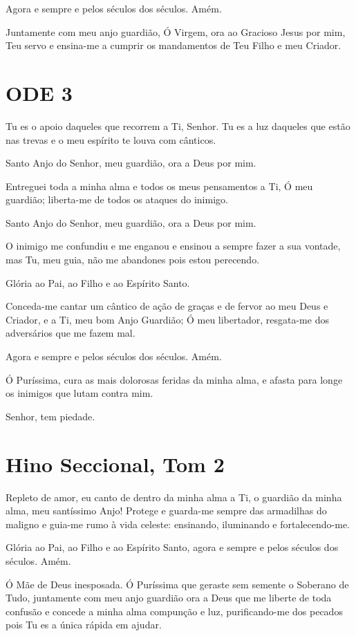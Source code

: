 \documentclass{subfiles}
\begin{document}
Agora e sempre e pelos séculos dos séculos. Amém.

Juntamente com meu anjo guardião, Ó Virgem, ora ao Gracioso Jesus
por mim, Teu servo e ensina-me a cumprir os mandamentos de Teu Filho e
meu Criador.

\section*{ODE 3}

\eirmos{}Tu es o apoio daqueles que recorrem a Ti, Senhor. Tu es a luz daqueles
que estão nas trevas e o meu espírito te louva com cânticos.

Santo Anjo do Senhor, meu guardião, ora a Deus por mim.

Entreguei toda a minha alma e todos os meus pensamentos a Ti, Ó
meu guardião; liberta-me de todos os ataques do inimigo.

Santo Anjo do Senhor, meu guardião, ora a Deus por mim.

O inimigo me confundiu e me enganou e ensinou a sempre fazer a sua
vontade, mas Tu, meu guia, não me abandones pois estou perecendo.

Glória ao Pai, ao Filho e ao Espírito Santo.

Conceda-me cantar um cântico de ação de graças e de fervor ao meu
Deus e Criador, e a Ti, meu bom Anjo Guardião; Ó meu libertador, resgata-me
dos adversários que me fazem mal.

Agora e sempre e pelos séculos dos séculos. Amém.

Ó Puríssima, cura as mais dolorosas feridas da minha alma, e afasta
para longe os inimigos que lutam contra mim.

Senhor, tem piedade. 

\section*{Hino Seccional, Tom 2}

Repleto de amor, eu canto de dentro da minha alma a Ti, o guardião da minha
alma, meu santíssimo Anjo! Protege e guarda-me sempre das armadilhas do maligno
e guia-me rumo à vida celeste: ensinando, iluminando e fortalecendo-me.

Glória ao Pai, ao Filho e ao Espírito Santo, agora e sempre e pelos séculos dos
séculos. Amém.

\theotokion{}Ó Mãe de Deus inesposada. Ó Puríssima que geraste sem
semente o Soberano de Tudo, juntamente com meu anjo guardião ora a Deus
que me liberte de toda confusão e concede a minha alma compunção e luz,
purificando-me dos pecados pois Tu es a única rápida em ajudar.
\end{document}
